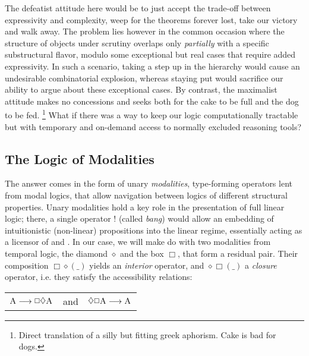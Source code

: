 The defeatist attitude here would be to just accept the trade-off between expressivity and complexity, weep for the theorems forever lost, take our victory and walk away.
The problem lies however in the common occasion where the structure of objects under scrutiny overlaps only \textit{partially} with a specific substructural flavor, modulo some exceptional but real cases that require added expressivity.
In such a scenario, taking a step up in the hierarchy would cause an undesirable combinatorial explosion, whereas staying put would sacrifice our ability to argue about these exceptional cases. 
By contrast, the maximalist attitude makes no concessions and seeks both for the cake to be full and the dog to be fed.%
\footnote{Direct translation of a silly but fitting greek aphorism. Cake is bad for dogs.}
What if there was a way to keep our logic computationally tractable but with temporary and on-demand access to normally excluded reasoning tools?

\subsection{The Logic of Modalities}
The answer comes in the form of unary \textit{modalities}, type-forming operators lent from modal logics, that allow navigation between logics of different structural properties.
Unary modalities hold a key role in the presentation of full linear logic; there, a single operator $!$ (called \textit{bang}) would allow an embedding of intuitionistic (non-linear) propositions into the linear regime, essentially acting as a licensor of \Contraction{} and \Weakening{}.
In our case, we will make do with two modalities from temporal logic, the diamond $\diamond$ and the box $\Box$, that form a residual pair.
Their composition $\Box\diamond(\_)$ yields an \textit{interior} operator, and $\diamond\Box(\_)$ a \textit{closure} operator, i.e. they satisfy the accessibility relations:
\begin{center}
\begin{tabularx}{0.5\textwidth}{@{}ccc@{}}
	$ \smallprop{A} \longrightarrow \Box\diamond \smallprop{A}$ & and & $\diamond\Box \smallprop{A} \longrightarrow \smallprop{A}$
\end{tabularx}
\end{center}

